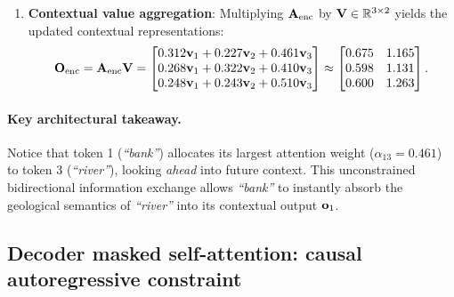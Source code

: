 \documentclass[../../main.tex]{subfiles}
\begin{document}
\begin{enumerate}
    Applying this across all rows yields the dense attention matrix:
    \begin{equation}
    \label{eq:enc_attn_weights}
    \mA_{\text{enc}} = \begin{bmatrix}
    0.312 & 0.227 & 0.461 \\
    0.268 & 0.322 & 0.410 \\
    0.248 & 0.243 & 0.510
    \end{bmatrix}.
    \end{equation}
    \item \textbf{Contextual value aggregation}:
    Multiplying $\mathbf{A}_{\text{enc}}$ by $\mathbf{V} \in \mathbb{R}^{3 \times 2}$ yields the updated contextual representations:
    \begin{equation}
    \label{eq:enc_output_matrix}
    \mathbf{O}_{\text{enc}} = \mathbf{A}_{\text{enc}} \mathbf{V} = \begin{bmatrix}
    0.312 \mathbf{v}_1 + 0.227 \mathbf{v}_2 + 0.461 \mathbf{v}_3 \\
    0.268 \mathbf{v}_1 + 0.322 \mathbf{v}_2 + 0.410 \mathbf{v}_3 \\
    0.248 \mathbf{v}_1 + 0.243 \mathbf{v}_2 + 0.510 \mathbf{v}_3
    \end{bmatrix}
    \approx \begin{bmatrix}
    0.675 & 1.165 \\
    0.598 & 1.131 \\
    0.600 & 1.263
    \end{bmatrix}.
    \end{equation}
\end{enumerate}
\paragraph{Key architectural takeaway.}
Notice that token 1 (\emph{``bank''}) allocates its largest attention weight ($\alpha_{13} = 0.461$) to token 3 (\emph{``river''}), looking \emph{ahead} into future context. This unconstrained bidirectional information exchange allows \emph{``bank''} to instantly absorb the geological semantics of \emph{``river''} into its contextual output $\mathbf{o}_1$.

\subsection{Decoder masked self-attention: causal autoregressive constraint}
\label{subsec:decoder_masked_self_attention}
\end{document}

